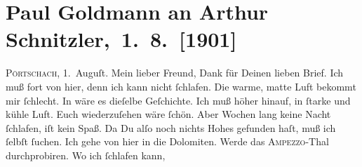 

         
         \renewcommand{\erwaehntePersonen}{Personen: Paul Goldmann, Olga Schnitzler, Elisabeth Steinrück}
         \renewcommand{\erwaehnteOrte}{Orte: Dolomiten, Lago di Garda, Pörtschach, Vahrn, Valle d’Ampezzo, Wien}
         \renewcommand{\erwaehnteWerke}{}
               \section[ Paul Goldmann an Arthur Schnitzler, 1. 8. {[}1901{]}]{ Paul Goldmann an Arthur Schnitzler, 1. 8. {[}1901{]}}\nopagebreak{}\rehead{ }\begin{ledgroupsized}[t]{13cm}\normalsize\beginnumbering \toendnotes[C]{\smallbreak\pagebreak[2]} 
\toendnotes[C]{\smallbreak}\pstart
           \raggedleft{}{\pb}\textsc{Pörtschach}, 1. Auguſt.\pend
           \pstart\center{}Mein lieber Freund,\pend\pstart
           Dank für Deinen lieben Brief.\pend
           \pstart
           Ich muß fort von hier, denn ich kann nicht ſchlafen. Die warme, matte Luft bekommt
               mir ſchlecht. In \label{K_L03076-1v}\label{K_L03076-1h} wäre es dieſelbe
               Geſchichte. Ich muß höher hinauf, in ſtarke und kühle Luft. Euch wiederzuſehen wäre ſchön. Aber Wochen
               lang keine Nacht ſchlafen, iſt kein Spaß. Da Du alſo noch nichts Hohes gefunden haſt,
               muß ich ſelbſt ſuchen. Ich gehe von hier in die Dolomiten. Werde das \textsc{Ampezzo}-Thal durchprobiren. Wo ich ſchlafen kann,

\end{ledgroupsized}
